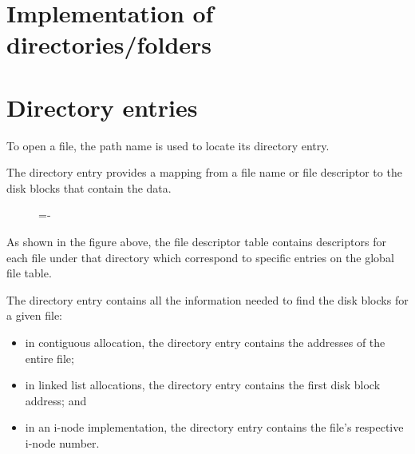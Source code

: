 \documentclass[a4paper]{systems-software}
\begin{document}
\newpage

\section{Implementation of directories/folders}

\section*{Directory entries}

To open a file, the path name is used to locate its directory entry. 

The directory entry provides a mapping from a file name or file descriptor to the disk blocks that contain the data.

\begin{figure}[H]
  \lineskip=-\fboxrule
\end{figure}

As shown in the figure above, the file descriptor table contains descriptors for each file under that directory which correspond to specific entries on the global file table.

The directory entry contains all the information needed to find the disk blocks for a given file:
\begin{itemize}
	\item in contiguous allocation, the directory entry contains the addresses of the entire file;
	\item in linked list allocations, the directory entry contains the first disk block address; and
	\item in an i-node implementation, the directory entry contains the file's respective i-node number.
\end{itemize}
\end{document}
